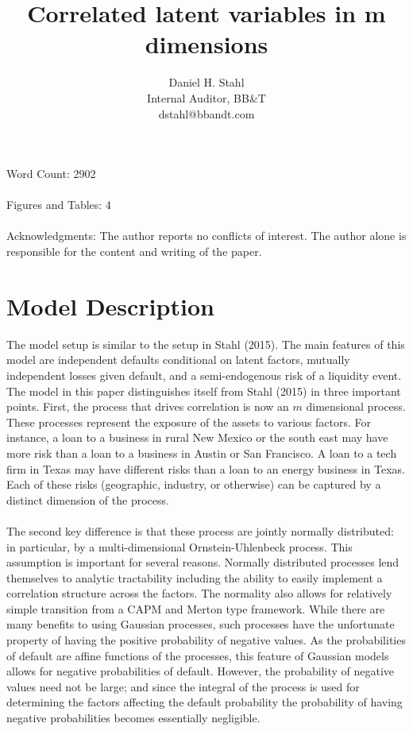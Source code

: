\documentclass[12pt]{article}
\theoremstyle{definition}
\begin{document}
\title{Correlated latent variables in m dimensions}
\date{}
\author{Daniel H. Stahl\\Internal Auditor, BB\&T
        \\dstahl@bbandt.com}

\maketitle
Word Count: 2902
\\
\\
Figures and Tables: 4
\\
\\
Acknowledgments: The author reports no conflicts of interest.  The author alone is responsible for the content and writing of the paper.
\newpage
 
\section{Model Description}
The model setup is similar to the setup in Stahl (2015).  The main features of this model are independent defaults conditional on latent factors, mutually independent losses given default, and a semi-endogenous risk of a liquidity event.  The model in this paper distinguishes itself from Stahl (2015) in three important points.  First, the process that drives correlation is now an \(m\) dimensional process.  These processes represent the exposure of the assets to various factors.  For instance, a loan to a business in rural New Mexico or the south east may have more risk than a loan to a business in Austin or San Francisco.  A loan to a tech firm in Texas may have different risks than a loan to an energy business in Texas.  Each of these risks (geographic, industry, or otherwise) can be captured by a distinct dimension of the process.  
\\
\\
The second key difference is that these process are jointly normally distributed: in particular, by a multi-dimensional Ornstein-Uhlenbeck process.  This assumption is important for several reasons.  Normally distributed processes lend themselves to analytic tractability including the ability to easily implement a correlation structure across the factors.  The normality also allows for relatively simple transition from a CAPM and Merton type framework.  While there are many benefits to using Gaussian processes, such processes have the unfortunate property of having the positive probability of negative values.  As the probabilities of default are affine functions of the processes, this feature of Gaussian models allows for negative probabilities of default.  However, the probability of negative values need not be large; and since the integral of the process is used for determining the factors affecting the default probability the probability of having negative probabilities becomes essentially negligible.  
\end{document}
